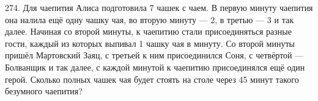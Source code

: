 274. Для чаепития Алиса подготовила 7 чашек с чаем. В первую минуту чаепития она налила ещё одну чашку чая, во вторую минуту --- 2, в третью --- 3 и так далее. Начиная со второй минуты, к чаепитию стали присоединяться разные гости, каждый из которых выпивал 1 чашку чая в минуту. Со второй минуты пришёл Мартовский Заяц, с третьей к ним присоединился Соня, с четвёртой  --- Болванщик и так далее, с каждой минутой к чаепитию присоединялся ещё один герой. Сколько полных чашек чая будет стоять на столе через 45 минут такого безумного чаепития?\\
